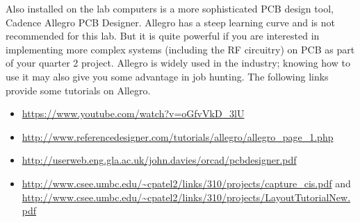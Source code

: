\documentclass[letterpaper, 11pt]{article}
\begin{document}
Also installed on the lab computers is a more sophisticated PCB design tool, Cadence Allegro PCB Designer. Allegro has a steep learning curve and is not recommended for this lab. But it is quite powerful if you are interested in implementing more complex systems (including the RF circuitry) on PCB as part of your quarter 2 project. Allegro is widely used in the  industry; knowing how to use it may also give you some advantage in job hunting. The following links provide some tutorials on Allegro. 

\begin{itemize}[itemsep=0.1ex]
	\item \url{https://www.youtube.com/watch?v=oGfvVkD_3lU}	
	\item \url{http://www.referencedesigner.com/tutorials/allegro/allegro_page_1.php}
	\item \url{http://userweb.eng.gla.ac.uk/john.davies/orcad/pcbdesigner.pdf}
	\item \url{http://www.csee.umbc.edu/~cpatel2/links/310/projects/capture_cis.pdf} and \\ \url{http://www.csee.umbc.edu/~cpatel2/links/310/projects/LayoutTutorialNew.pdf}
\end{itemize}
\end{document}
